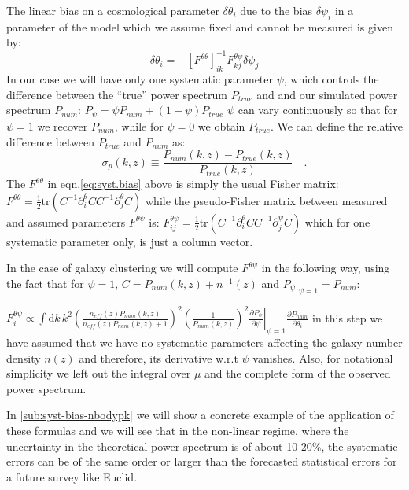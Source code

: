 The linear bias on a cosmological parameter $\delta\theta_{i}$ due
to the bias $\delta\psi_{i}$ in a parameter of the model which we
assume fixed and cannot be measured is given by: 
\begin{equation}
\delta\theta_{i}=-\left[F^{\theta\theta}\right]_{ik}^{-1}F_{kj}^{\theta\psi}\delta\psi_{j}\label{eq:syst.bias}
\end{equation}
In our case we will have only one systematic parameter $\psi$, which
controls the difference between the ``true'' power spectrum $P_{true}$
and and our simulated power spectrum $P_{num}$:
\beeqp$ 
P_{\psi}=\psi P_{num}+(1-\psi)P_{true}
$
$\psi$ can vary continuously so that for $\psi=1$ we recover $P_{num}$,
while for $\psi=0$ we obtain $P_{true}$. We can define 
the relative difference between $P_{true}$ and $P_{num}$ as:
\begin{equation}
\sigma_{p}(k,z)\equiv\frac{P_{num}(k,z)-P_{true}(k,z)}{P_{true}(k,z)} \quad .
\end{equation}
The $F^{\theta\theta}$ in eqn.\ref{eq:syst.bias} above is simply
the usual Fisher matrix: 
\beeqc$
F^{\theta\theta}=\frac{1}{2}\mbox{tr}\left(C^{-1}\partial_{i}^{\theta}CC^{-1}\partial_{j}^{\theta}C\right)
$
while the pseudo-Fisher matrix between measured and assumed parameters
$F^{\theta\psi}$ is:
\beeqc$ 
F_{ij}^{\theta\psi}=\frac{1}{2}\mbox{tr}\left(C^{-1}\partial_{i}^{\theta}CC^{-1}\partial_{j}^{\psi}C\right)
$
which for one systematic parameter only, is just a column vector.

In the case of galaxy clustering we will compute $F^{\theta\psi}$
in the following way, using the fact that for $\psi=1$, $C=P_{num}(k,z)+n^{-1}(z)$
and $P_{\psi}|_{\psi=1}=P_{num}$:

\beeq$ \label{eq:pseudo-Fisher}
F_{i}^{\theta\psi}\propto\int\mbox{d}k\, k^{2}\left(\frac{n_{eff}(z)P_{num}(k,z)}{n_{eff}(z)P_{num}(k,z)+1}\right)^{2}\left(\frac{1}{P_{num}(k,z)}\right)^{2}\left.\frac{\partial P_{\psi}}{\partial\psi}\right|_{\psi=1}\frac{\partial P_{num}}{\partial\theta_{i}}
$
in this step we have assumed that we have no systematic parameters
affecting the galaxy number density $n(z)$ and therefore, its derivative
w.r.t $\psi$ vanishes. Also, for notational simplicity we left out the integral over $\mu$ and the complete
form of the observed power spectrum.

In \cref{sub:syst-bias-nbodypk} we will show a concrete example of the application of these formulas
and we will see that in the non-linear regime, where the uncertainty in 
the theoretical power spectrum is of about 10-20\%, the systematic
errors can be of the same order or larger than the forecasted statistical errors for a future survey like Euclid.


